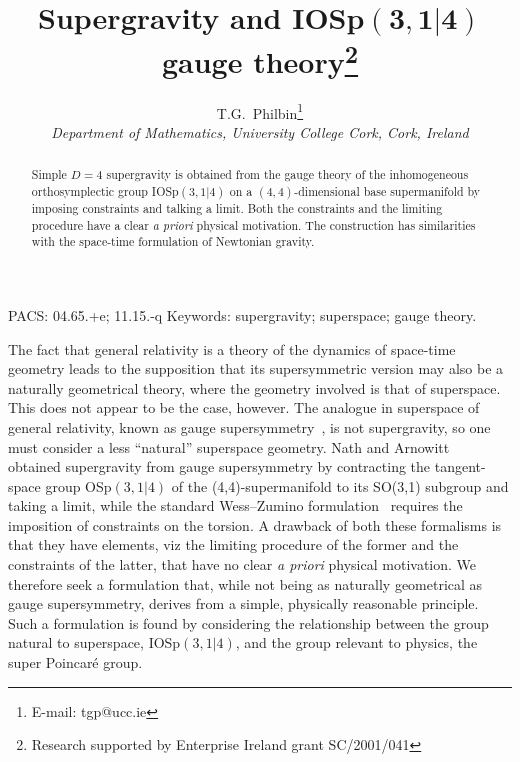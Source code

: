 \documentclass[a4paper,12pt]{article}
\begin{document}

\setlength{\abovedisplayskip}{10pt plus 3pt minus 9pt}
\setlength{\belowdisplayskip}{10pt plus 3pt minus 9pt}
\setlength{\abovedisplayshortskip}{0pt plus 3pt}
\setlength{\belowdisplayshortskip}{5pt plus 3pt minus 4pt}

\title{\bf Supergravity and IOSp$\mathbf{(3,1|4)}$ gauge theory\thanks{Research supported by Enterprise Ireland grant SC/2001/041}}

\author{T.G.\ Philbin\thanks{E-mail: tgp@ucc.ie} \\
 \small \it  Department of Mathematics, University College Cork, Cork, Ireland}  


\date{}

\maketitle

\begin{abstract}
Simple $D=4$ supergravity is obtained from the gauge theory of the inhomogeneous orthosymplectic group IOSp$(3,1|4)$ on a $(4,4)$-dimensional base supermanifold by imposing constraints and talking a limit. Both the constraints and the limiting procedure have a clear {\it a priori} physical motivation. The construction has similarities with the space-time formulation of Newtonian gravity.
\end{abstract}

\noindent
{\small  PACS:  04.65.+e; 11.15.-q  \newline
   Keywords: supergravity; superspace; gauge theory.}
\vspace{10mm}

The fact that general relativity is a theory of the dynamics of space-time geometry leads to the supposition that its supersymmetric version may also be a naturally geometrical theory, where the geometry involved is that of superspace. This does not appear to be the case, however. The analogue in superspace of general relativity, known as gauge supersymmetry~\cite{nat1}, is not supergravity, so one must consider a less ``natural'' superspace geometry. Nath and Arnowitt~\cite{nat2} obtained supergravity from gauge supersymmetry by contracting the tangent-space group OSp$(3,1|4)$ of the (4,4)-supermanifold to its SO(3,1) subgroup and taking a limit, while the standard Wess--Zumino formulation~\cite{wes} requires the imposition of constraints on the torsion. A drawback of both these formalisms is that they have elements, viz the limiting procedure of the former and the constraints of the latter, that have no clear {\it a priori} physical motivation.  We therefore seek a formulation that, while not being as naturally geometrical as gauge supersymmetry, derives from a simple, physically reasonable principle. Such a formulation is found by considering the relationship between the group natural to superspace, IOSp$(3,1|4)$, and the group relevant to physics, the super Poincar\'{e} group.
\end{document}
